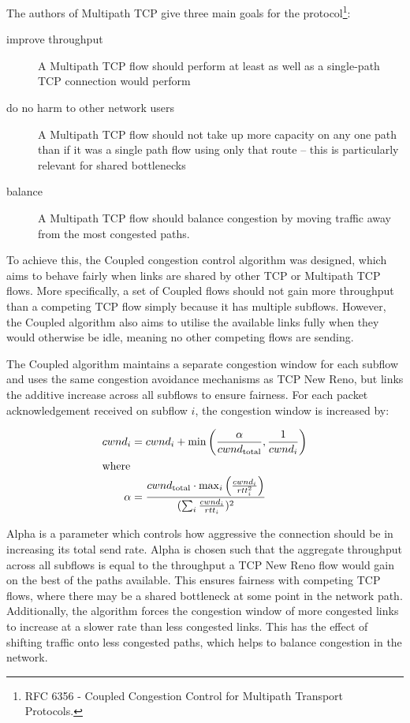 
The authors of Multipath TCP give three main goals for the protocol\footnote{RFC 
6356 - Coupled Congestion Control for Multipath Transport Protocols.}:

\begin{description}
  \item[improve throughput] A Multipath TCP flow should perform at least as well
    as a single-path TCP connection would perform
  \item[do no harm to other network users] A Multipath TCP flow should not take
    up more capacity on any one path than if it was a single path flow using
    only that route -- this is particularly relevant for shared bottlenecks
  \item[balance] A Multipath TCP flow should balance congestion by moving
    traffic away from the most congested paths.
\end{description}

To achieve this, the Coupled congestion control algorithm was designed, which
aims to behave fairly when links are shared by other TCP or Multipath TCP flows.
More specifically, a set of Coupled flows should not gain more throughput than a
competing TCP flow simply because it has multiple subflows. However, the Coupled
algorithm also aims to utilise the available links fully when they would
otherwise be idle, meaning no other competing flows are sending.

The Coupled algorithm maintains a separate congestion window for each subflow
and uses the same congestion avoidance mechanisms as TCP New Reno, but links the
additive increase across all subflows to ensure fairness. For each packet
acknowledgement received on subflow $i$, the congestion window is increased by:

\begin{align*}
  cwnd_i &= cwnd_i +
    \min\left(\frac{\alpha}{cwnd_\text{total}}, \frac{1}{cwnd_i}\right) \\
  \intertext{where}
  \alpha &=
    \frac{cwnd_\text{total} \cdot \max_i\left(\frac{cwnd_i}{rtt_i^2}\right)}
         {(\sum_i \frac{cwnd_i}{rtt_i})^2}
\end{align*}

Alpha is a parameter which controls how aggressive the connection should be in
increasing its total send rate. Alpha is chosen such that the aggregate
throughput across all subflows is equal to the throughput a TCP New Reno flow
would gain on the best of the paths available. This ensures fairness with
competing TCP flows, where there may be a shared bottleneck at some point in the
network path. Additionally, the algorithm forces the congestion window of more
congested links to increase at a slower rate than less congested links. This has
the effect of shifting traffic onto less congested paths, which helps to balance
congestion in the network.

